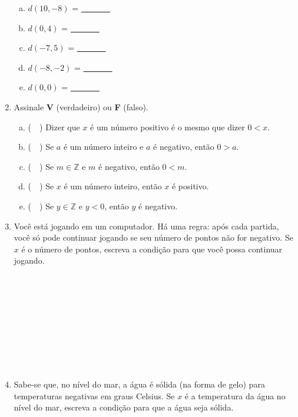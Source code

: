 \documentclass[a4paper,14pt]{article}
\begin{document}
\begin{multicols}{2}
\begin{enumerate}
\begin{enumerate}[a)]
				\item $d(10, -8)$ = \underline{~~~~~~~} 
				\item $d(0, 4)$ = \underline{~~~~~~~} 
				\item $d(-7, 5)$ = \underline{~~~~~~~} 
				\item $d(-8, -2)$ = \underline{~~~~~~~} 
				\item $d(0, 0)$ = \underline{~~~~~~~} 
			\end{enumerate}
			\item Assinale \textbf{V} (verdadeiro) ou \textbf{F} (falso).
			\begin{enumerate}[a)]
				\item (~~) Dizer que $x$ é um número positivo é o mesmo que dizer $0 < x$.
				\item (~~) Se $a$ é um número inteiro e $a$ é negativo, então $0 > a$.
				\item (~~) Se $m \in \mathbb{Z}$ e $m$ é negativo, então $0 < m$.
				\item (~~) Se $x$ é um número inteiro, então $x$ é positivo.
				\item (~~) Se $y \in \mathbb{Z}$ e $y < 0$, então $y$ é negativo.
			\end{enumerate}
			\item Você está jogando em um computador. Há uma regra: após cada partida, você só pode continuar jogando se seu número de pontos não for negativo. Se $x$ é o número de pontos, escreva a condição para que você possa continuar jogando. \\\\\\\\\\\\\\\\\\\\
			\item Sabe-se que, no nível do mar, a água é sólida (na forma de gelo) para temperaturas negativas em graus Celsius. Se $x$ é a temperatura da água no nível do mar, escreva a condição para que a água seja sólida.
		\end{enumerate}

\end{multicols}
\end{document}
